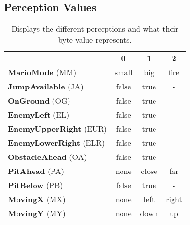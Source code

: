 

\begin{appendices}

\setcounter{table}{0}
\renewcommand\thetable{\thesection\arabic{table}}
\setcounter{figure}{0}
\renewcommand\thefigure{\thesection\arabic{figure}}
\setcounter{lstlisting}{0}
\renewcommand\thelstlisting{\thesection\arabic{lstlisting}}

\makeatletter
{}
\makeatother

\section{Perception Values}
\label{app:percond}

\vspace{-1\baselineskip}
\begin{table}[h]
  \begin{center} 
    \begin{tabular}{ l c c c}
    & \textbf{0} & \textbf{1} & \textbf{2} \\
    \textbf{MarioMode} (MM) & small & big & fire \\
    \textbf{JumpAvailable} (JA) & false & true & -  \\
    \textbf{OnGround} (OG) & false & true & -  \\
    \textbf{EnemyLeft} (EL) & false & true & -  \\
    \textbf{EnemyUpperRight} (EUR) & false & true & -  \\
    \textbf{EnemyLowerRight} (ELR) & false & true & -  \\
    \textbf{ObstacleAhead} (OA) & false & true & -  \\
    \textbf{PitAhead} (PA) & none & close & far \\
    \textbf{PitBelow} (PB) & false & true & -  \\
    \textbf{MovingX} (MX) & none & left & right \\
    \textbf{MovingY} (MY) & none & down & up \\
    \end{tabular}
    \end{center}
  \caption{Displays the different perceptions and what their byte value represents.}
  \label{tab:AgKey}
\end{table}


\end{appendices}
